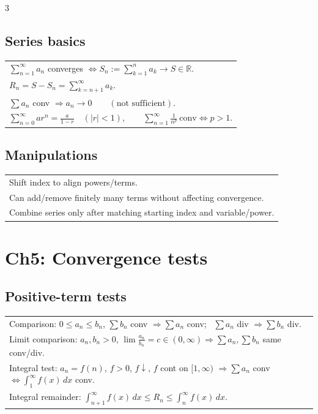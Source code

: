 \documentclass[10pt]{article}
\newcommand{\dx}{\,dx}
\begin{document}
\begin{multicols}{3}
\subsection*{Series basics}
\begin{tabular}{@{}p{}@{}}
$\displaystyle\sum_{n=1}^\infty a_n$ converges $\iff S_n:=\sum_{k=1}^n a_k \to S\in\mathbb{R}$.\\
$R_n=S-S_n=\displaystyle\sum_{k=n+1}^{\infty}a_k$.\\
$\displaystyle\sum a_n$ conv $\Rightarrow a_n\to 0 \qquad (\text{not sufficient}).$\\
$\displaystyle\sum_{n=0}^{\infty}ar^n=\frac{a}{1-r}\quad (|r|<1),\qquad \sum_{n=1}^{\infty}\frac1{n^p}\ \text{conv} \iff p>1.$\\
\end{tabular}

\subsection*{Manipulations}
\begin{tabular}{@{}p{}@{}}
Shift index to align powers/terms.\\
Can add/remove finitely many terms without affecting convergence.\\
Combine series only after matching starting index and variable/power.\\
\end{tabular}

\section*{Ch5: Convergence tests}
\subsection*{Positive-term tests}
\begin{tabular}{@{}p{}@{}}
Comparison: $0\le a_n\le b_n$, $\sum b_n$ conv $\Rightarrow \sum a_n$ conv; \ $\sum a_n$ div $\Rightarrow \sum b_n$ div.\\
Limit comparison: $a_n,b_n>0$, $\displaystyle\lim \frac{a_n}{b_n}=c\in(0,\infty)\Rightarrow \sum a_n,\sum b_n$ same conv/div.\\
Integral test: $a_n=f(n)$, $f>0$, $f\downarrow$, $f$ cont on $[1,\infty)$ $\Rightarrow \sum a_n$ conv $\Leftrightarrow \displaystyle\int_1^\infty f(x)\dx$ conv.\\
Integral remainder: $\displaystyle\int_{n+1}^\infty f(x)\dx\le R_n\le \int_n^\infty f(x)\dx.$\\
\end{tabular}


\end{multicols}
\end{document}
